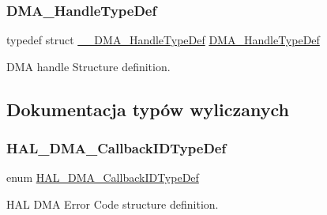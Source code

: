 \subsubsection{\texorpdfstring{D\+M\+A\+\_\+\+Handle\+Type\+Def}{DMA\_HandleTypeDef}}
{\footnotesize\ttfamily typedef struct \hyperlink{struct_____d_m_a___handle_type_def}{\+\_\+\+\_\+\+D\+M\+A\+\_\+\+Handle\+Type\+Def} \hyperlink{group___d_m_a___exported___types_ga41b754a906b86bce54dc79938970138b}{D\+M\+A\+\_\+\+Handle\+Type\+Def}}



D\+MA handle Structure definition. 



\subsection{Dokumentacja typów wyliczanych}
\mbox{\label{group___d_m_a___exported___types_gafbe8b2bd9ce2128de6cdc08ccde7e8ad}} 
\subsubsection{\texorpdfstring{H\+A\+L\+\_\+\+D\+M\+A\+\_\+\+Callback\+I\+D\+Type\+Def}{HAL\_DMA\_CallbackIDTypeDef}}
{\footnotesize\ttfamily enum \hyperlink{group___d_m_a___exported___types_gafbe8b2bd9ce2128de6cdc08ccde7e8ad}{H\+A\+L\+\_\+\+D\+M\+A\+\_\+\+Callback\+I\+D\+Type\+Def}}



H\+AL D\+MA Error Code structure definition. 

